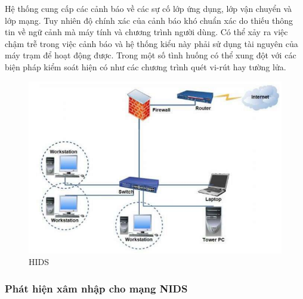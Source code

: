 Hệ thống cung cấp các cảnh báo về các sự cố lớp ứng dụng, lớp vận chuyển và lớp mạng. Tuy nhiên độ chính xác của cảnh báo khó chuẩn xác do thiếu thông tin về ngữ cảnh mà máy tính và chương trình người dùng. Có thể xảy ra việc chậm trễ trong việc cảnh báo và hệ thống kiểu này phải sử dụng tài nguyên của máy trạm để hoạt động được. Trong một số tình huống có thể xung đột với các biện pháp kiểm soát hiện có như các chương trình quét vi-rút hay tường lửa.
\begin{figure}[H]
    \centering
    \includegraphics[scale=0.6]{Chapter1/Figs/HIDS.png}
    \caption{HIDS}
     
\end{figure}
\subsubsection*{Phát hiện xâm nhập cho mạng NIDS}

